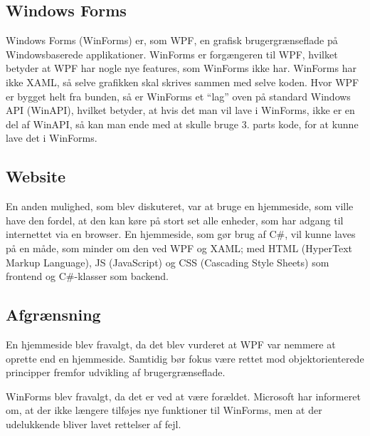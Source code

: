 \subsection{Windows Forms}
Windows Forms (WinForms) er, som \ac{WPF}, en grafisk brugergrænseflade på Windowsbaserede applikationer. 
WinForms er forgængeren til WPF, hvilket betyder at WPF har nogle nye features, som WinForms ikke har.
WinForms har ikke XAML, så selve grafikken skal skrives sammen med selve koden. 
Hvor WPF er bygget helt fra bunden, så er WinForms et ``lag'' oven på standard Windows API (WinAPI), hvilket betyder, at hvis det man vil lave i WinForms, ikke er en del af WinAPI, så kan man ende med at skulle bruge 3. parts kode, for at kunne lave det i WinForms.\citep{winforms2}

\subsection{Website}
En anden mulighed, som blev diskuteret, var at bruge en hjemmeside, som ville have den fordel, at den kan køre på stort set alle enheder, som har adgang til internettet via en browser. 
En hjemmeside, som gør brug af C\#, vil kunne laves på en måde, som minder om den ved WPF og XAML; med HTML (HyperText Markup Language), JS (JavaScript) og CSS (Cascading Style Sheets) som frontend og C\#-klasser som backend. 

\subsection{Afgrænsning}
En hjemmeside blev fravalgt, da det blev vurderet at WPF var nemmere at oprette end en hjemmeside.
Samtidig bør fokus være rettet mod objektorienterede principper fremfor udvikling af brugergrænseflade.

WinForms blev fravalgt, da det er ved at være forældet.
Microsoft har informeret om, at der ikke længere tilføjes nye funktioner til WinForms, men at der udelukkende bliver lavet rettelser af fejl.\citep{winforms}

